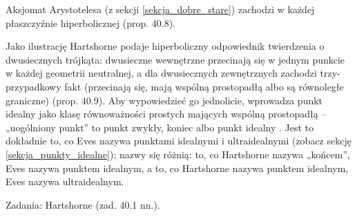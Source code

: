 Aksjomat Arystotelesa (z sekcji \ref{sekcja_dobre_stare}) zachodzi w każdej płaszczyźnie hiperbolicznej \cite[s. 380--382]{hartshorne_2000} (prop. 40.8). %

Jako ilustrację Hartshorne podaje hiperboliczny odpowiednik twierdzenia o dwusiecznych trójkąta: dwusieczne wewnętrzne przecinają się w jednym punkcie w każdej geometrii neutralnej, a dla dwusiecznych zewnętrznych zachodzi trzy-przypadkowy fakt (przecinają się, mają wspólną prostopadłą albo są równoległe graniczne) \cite[s. 382--384]{hartshorne_2000} (prop. 40.9). %
Aby wypowiedzieć go jednolicie, wprowadza punkt idealny jako klasę równoważności prostych mających wspólną prostopadłą -- „uogólniony punkt'' to punkt zwykły, koniec albo punkt idealny \cite[s. 384]{hartshorne_2000}. %
Jest to dokładnie to, co Eves nazywa punktami idealnymi i ultraidealnymi (zobacz sekcję \ref{sekcja_punkty_idealne}); nazwy się różnią: to, co Hartshorne nazywa „końcem'', Eves nazywa punktem idealnym, a to, co Hartshorne nazywa punktem idealnym, Eves nazywa ultraidealnym. %

Zadania: Hartshorne \cite[s. 384 nn.]{hartshorne_2000} (zad. 40.1 nn.). %


